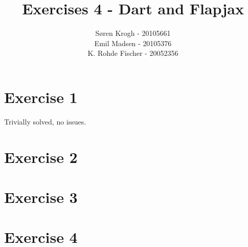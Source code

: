 \documentclass[a4paper,10pt]{article}
\author{
Søren Krogh -  20105661 \\
Emil Madsen - 20105376  \\
K. Rohde Fischer - 20052356\\}
\title{Exercises 4 - Dart and Flapjax}
\begin{document}
\maketitle

\section*{Exercise 1}
Trivially solved, no issues.

\section*{Exercise 2}
\section*{Exercise 3}

\section*{Exercise 4}


\section*{}

\section*{}

\subsection*{}

\section*{}
\end{document}
